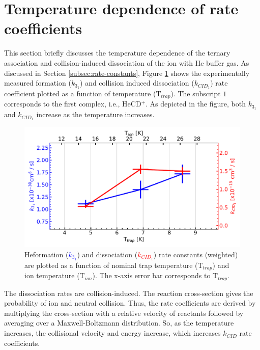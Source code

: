 \section{Temperature dependence of rate coefficients}
\label{subsec:temp-dependence}

This section briefly discusses the temperature dependence of the ternary
association and collision-induced dissociation of the \CD ion with He buffer gas.
As discussed in Section \ref{subsec:rate-constants}, Figure
\ref{fig:off:rate-constants:f(t)} shows the experimentally measured formation
($k_{3_1}$) and collision induced dissociation ($k_{CID_1}$) rate coefficient plotted
as a function of temperature (T$_{trap}$). The subscript $1$ corresponds to the
first complex, i.e., HeCD$^+$. As depicted in the figure, both $k_{3_1}$ and
$k_{CID_1}$ increase as the temperature increases.

\begin{figure}[!htb]
    \centering
    \includegraphics[width=1\textwidth]{figures/measurements/kinetics/functionOf_T/off_k3_kCID_as_functionOfT_with_Tcol.pdf}
    \caption{He\CD formation (\textcolor{blue}{$k_{3_1}$}) and dissociation (\textcolor{red}{$k_{CID_1}$}) rate constants (weighted) are plotted as a function of nominal trap temperature (T$_{trap}$) and ion temperature (T$_{ion}$). The x-axis error bar corresponds to T$_{trap}$. }
    \label{fig:off:rate-constants:f(t)}
\end{figure}

The dissociation rates are collision-induced. The reaction cross-section gives
the probability of ion and neutral collision. Thus, the rate coefficients are
derived by multiplying the cross-section with a relative velocity of reactants
followed by averaging over a Maxwell-Boltzmann distribution. So, as the
temperature increases, the collisional velocity and energy increase, which
increases $k_{CID}$ rate coefficients.\\


